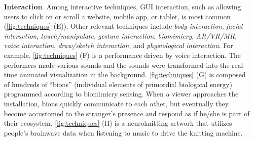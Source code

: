 \textbf{Interaction}. 
Among interactive techniques, GUI interaction, such as allowing users to click on or scroll a website, mobile app, or tablet, is most common (\eg \autoref{fig:techniques} (E)). 
Other relevant techniques include \textit{body interaction}, \textit{facial interaction}, \textit{touch/manipulate}, \textit{gesture interaction}, \textit{biomimicry}, 
\textit{AR/VR/MR}, \textit{voice interaction},  \textit{draw/sketch interaction}, and \textit{physiological interaction}. 
For example, \autoref{fig:techniques} (F) is a performance driven by voice interaction. The performers made various sounds and the sounds were transformed into the real-time animated visualization in the background. 
\autoref{fig:techniques} (G) is composed of hundreds of ``bions'' (individual elements of primordial biological energy) programmed according to biomimicry sensing. When a viewer approaches the installation, bions quickly communicate to each other, but eventually they become accustomed to the stranger's presence and respond as if he/she is part of their ecosystem.
\autoref{fig:techniques} (H) is a neuroknitting artwork that utilizes people's brainwave data when listening to music to drive the knitting machine.


